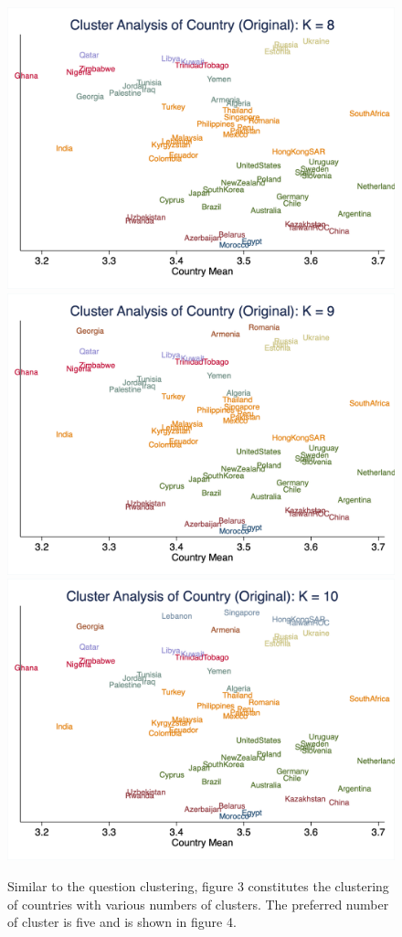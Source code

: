 \documentclass[10pt,leqno]{article}
\begin{document}
\begin{figure}  [h!]
\begin{center}
\includegraphics[scale=0.15]{CA_CountryK8_ORI.png}
\includegraphics[scale=0.15]{CA_CountryK9_ORI.png}
\includegraphics[scale=0.15]{CA_CountryK10_ORI.png}
\end{center}
Similar to the question clustering, figure 3 constitutes the clustering of countries with various numbers of clusters. The preferred number of cluster is five and is shown in figure 4.
\end{figure}  
\end{document}
